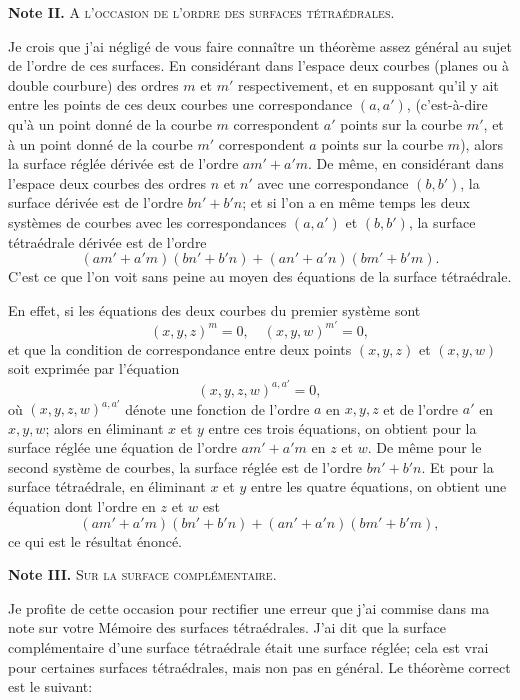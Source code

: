 \documentclass[12pt,a4paper]{article}
\theoremstyle{definition}
\begin{document}
\smallskip\noindent
\textbf{Note II.}\quad
\textsc{A l'occasion de l'ordre des surfaces t\'etra\'edrales.}

\smallskip
Je crois que j'ai n\'eglig\'e de vous faire conna\^itre un th\'eor\`eme assez g\'en\'eral au sujet de l'ordre de ces surfaces. En consid\'erant dans l'espace deux courbes (planes ou \`a double courbure) des ordres $m$ et $m'$ respectivement, et en supposant qu'il y ait entre les points de ces deux courbes une correspondance $(a, a')$, (c'est-\`a-dire qu'\`a un point donn\'e de la courbe $m$ correspondent $a'$ points sur la courbe $m'$, et \`a un point donn\'e de la courbe $m'$ correspondent $a$ points sur la courbe $m$), alors la surface r\'egl\'ee d\'eriv\'ee est de l'ordre $am' + a'm$. De m\^eme, en consid\'erant dans l'espace deux courbes des ordres $n$ et $n'$ avec une correspondance $(b, b')$, la surface d\'eriv\'ee est de l'ordre $bn' + b'n$; et si l'on a en m\^eme temps les deux syst\`emes de courbes avec les correspondances $(a, a')$ et $(b, b')$, la surface t\'etra\'edrale d\'eriv\'ee est de l'ordre
\[
(am' + a'm)(bn' + b'n) + (an' + a'n)(bm' + b'm).
\]
C'est ce que l'on voit sans peine au moyen des \'equations de la surface t\'etra\'edrale.

En effet, si les \'equations des deux courbes du premier syst\`eme sont
\[
(x, y, z)^m = 0, \quad (x, y, w)^{m'} = 0,
\]
et que la condition de correspondance entre deux points $(x, y, z)$ et $(x, y, w)$ soit exprim\'ee par l'\'equation
\[
(x, y, z, w)^{a, a'} = 0,
\]
o\`u $(x, y, z, w)^{a, a'}$ d\'enote une fonction de l'ordre $a$ en $x, y, z$ et de l'ordre $a'$ en $x, y, w$; alors en \'eliminant $x$ et $y$ entre ces trois \'equations, on obtient pour la surface r\'egl\'ee une \'equation de l'ordre $am' + a'm$ en $z$ et $w$. De m\^eme pour le second syst\`eme de courbes, la surface r\'egl\'ee est de l'ordre $bn' + b'n$. Et pour la surface t\'etra\'edrale, en \'eliminant $x$ et $y$ entre les quatre \'equations, on obtient une \'equation dont l'ordre en $z$ et $w$ est
\[
(am' + a'm)(bn' + b'n) + (an' + a'n)(bm' + b'm),
\]
ce qui est le r\'esultat \'enonc\'e.

\newpage
\setcounter{page}{54}

\noindent
\textbf{Note III.}\quad
\textsc{Sur la surface compl\'ementaire.}

\smallskip
Je profite de cette occasion pour rectifier une erreur que j'ai commise dans ma note sur votre M\'emoire des surfaces t\'etra\'edrales. J'ai dit que la surface compl\'ementaire d'une surface t\'etra\'edrale \'etait une surface r\'egl\'ee; cela est vrai pour certaines surfaces t\'etra\'edrales, mais non pas en g\'en\'eral. Le th\'eor\`eme correct est le suivant:
\end{document}
